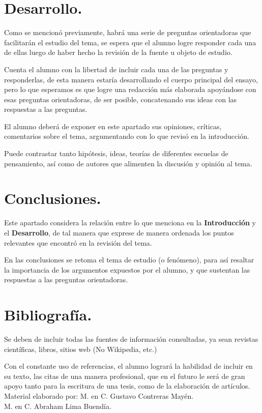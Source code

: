 \section{Desarrollo.}
Como se mencionó previamente, habrá una serie de preguntas orientadoras que facilitarán el estudio del tema, se espera que el alumno logre responder cada una de ellas luego de haber hecho la revisión de la fuente u objeto de estudio.
\par
Cuenta el alumno con la libertad de incluir cada una de las preguntas y responderlas, de esta manera estaría desarrollando el cuerpo principal del ensayo, pero lo que esperamos es que logre una redacción más elaborada apoyándose con esas preguntas orientadoras, de ser posible, concatenando sus ideas con las respuestas a las preguntas.
\par
El alumno deberá de exponer en este apartado sus opiniones, críticas, comentarios sobre el tema, argumentando con lo que revisó en la introducción.
\par
Puede contrastar tanto hipótesis, ideas, teorías de diferentes escuelas de pensamiento, así como de autores que alimenten la discusión y opinión al tema.
\section{Conclusiones.}
Este apartado considera la relación entre lo que menciona en la \textbf{Introducción} y el \textbf{Desarrollo}, de tal manera que exprese de manera ordenada los puntos relevantes que encontró en la revisión del tema.
\par
En las conclusiones se retoma el tema de estudio (o fenómeno), para así resaltar la importancia de los argumentos expuestos por el alumno, y que sustentan las respuestas a las preguntas orientadoras.
\section{Bibliografía.}
Se deben de incluir todas las fuentes de información consultadas, ya sean revistas científicas, libros, sitios web (No Wikipedia, etc.)
\par
Con el constante uso de referencias, el alumno logrará la habilidad de incluir en su texto, las citas de una manera profesional, que en el futuro le será de gran apoyo tanto para la escritura de una tesis, como de la elaboración de artículos.
\vfill
\small{Material elaborado por: M. en C. Gustavo Contreras Mayén. \\ \hspace*{4.57cm} M. en C. Abraham Lima Buendía.}
